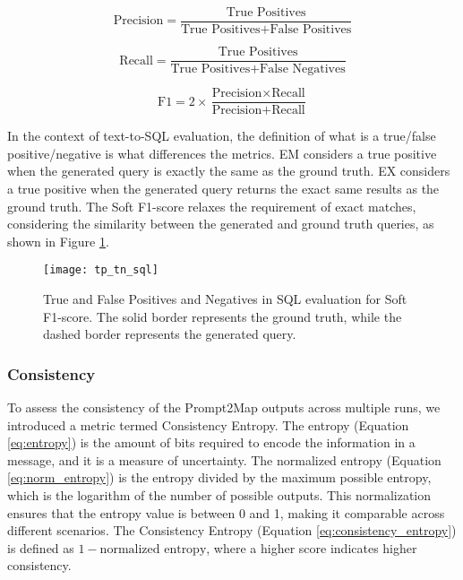 \begin{equation}
    \text{Precision} = \frac{\text{True Positives}}{\text{True Positives} + \text{False Positives}}
    \label{eq:precision}
\end{equation}

\begin{equation}
    \text{Recall} = \frac{\text{True Positives}}{\text{True Positives} + \text{False Negatives}}
    \label{eq:recall}
\end{equation}

\begin{equation}
    \text{F1} = 2 \times \frac{\text{Precision} \times \text{Recall}}{\text{Precision} + \text{Recall}}
    \label{eq:f1}
\end{equation}

In the context of text-to-SQL evaluation, the definition of what is a true/false positive/negative is what differences the metrics. EM considers a true positive when the generated query is exactly the same as the ground truth. EX considers a true positive when the generated query returns the exact same results as the ground truth. The Soft F1-score relaxes the requirement of exact matches, considering the similarity between the generated and ground truth queries, as shown in Figure \ref{fig:tp_tn_sql}.

\begin{figure}[htbp]
    \centering
    \texttt{[image: tp\_tn\_sql]}
    \caption{True and False Positives and Negatives in SQL evaluation for Soft F1-score. The solid border represents the ground truth, while the dashed border represents the generated query.}
    \label{fig:tp_tn_sql}
\end{figure}

\subsubsection{Consistency}

To assess the consistency of the Prompt2Map outputs across multiple runs, we introduced a metric termed Consistency Entropy. The entropy (Equation \ref{eq:entropy}) is the amount of bits required to encode the information in a message, and it is a measure of uncertainty. The normalized entropy (Equation \ref{eq:norm_entropy}) is the entropy divided by the maximum possible entropy, which is the logarithm of the number of possible outputs. This normalization ensures that the entropy value is between 0 and 1, making it comparable across different scenarios. The Consistency Entropy (Equation \ref{eq:consistency_entropy}) is defined as \(1 - \text{normalized entropy}\), where a higher score indicates higher consistency.


